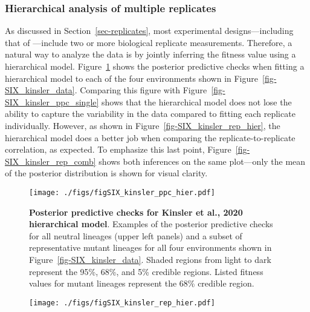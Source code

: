 \documentclass[
]{scrartcl}
\begin{document}
\begin{refsegment}
\begin{figure}
\end{figure}

\hypertarget{hierarchical-analysis-of-multiple-replicates}{%
\subsubsection{Hierarchical analysis of multiple
replicates}\label{hierarchical-analysis-of-multiple-replicates}}

As discussed in Section~\ref{sec-replicates}, most experimental
designs---including that of \textcite{kinsler2020}---include two or more
biological replicate measurements. Therefore, a natural way to analyze
the data is by jointly inferring the fitness value using a hierarchical
model. Figure~\ref{fig-SIX_kinsler_ppc_hier} shows the posterior
predictive checks when fitting a hierarchical model to each of the four
environments shown in Figure~\ref{fig-SIX_kinsler_data}. Comparing this
figure with Figure~\ref{fig-SIX_kinsler_ppc_single} shows that the
hierarchical model does not lose the ability to capture the variability
in the data compared to fitting each replicate individually. However, as
shown in Figure~\ref{fig-SIX_kinsler_rep_hier}, the hierarchical model
does a better job when comparing the replicate-to-replicate correlation,
as expected. To emphasize this last point,
Figure~\ref{fig-SIX_kinsler_rep_comb} shows both inferences on the same
plot---only the mean of the posterior distribution is shown for visual
clarity.

\begin{figure}

{\centering \texttt{[image: ./figs/figSIX\_kinsler\_ppc\_hier.pdf]}

}

\caption{\label{fig-SIX_kinsler_ppc_hier}\textbf{Posterior predictive
checks for Kinsler et al., 2020 hierarchical model}. Examples of the
posterior predictive checks for all neutral lineages (upper left panels)
and a subset of representative mutant lineages for all four environments
shown in Figure~\ref{fig-SIX_kinsler_data}. Shaded regions from light to
dark represent the 95\%, 68\%, and 5\% credible regions. Listed fitness
values for mutant lineages represent the 68\% credible region.}

\end{figure}

\begin{figure}

{\centering \texttt{[image: ./figs/figSIX\_kinsler\_rep\_hier.pdf]}

}
\end{figure}
\end{refsegment}
\end{document}
